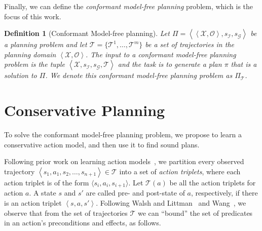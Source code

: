 \documentclass{article}
\newtheorem{definition}{Definition}
\newcommand{\tuple}[1]{\ensuremath{\left \langle #1 \right \rangle }}
\begin{document}
	Finally, we can define the {\em conformant model-free planning} problem, which is the focus of this work. 
	
	\begin{definition}[Conformant Model-free planning]
		Let $\Pi=\tuple{\tuple{\mathcal{X},\mathcal{O}},s_\mathcal{I}, s_\mathcal{G}}$ be a planning 
		problem and let $\mathcal{T}=\{\mathcal{T}^1,\ldots,\mathcal{T}^m\}$ be a set of trajectories in 
		the planning domain $\tuple{\mathcal{X},\mathcal{O}}$. 
		The input to a conformant model-free planning problem is 
		the tuple $\tuple{\mathcal{X},s_\mathcal{I}, s_\mathcal{G}, \mathcal{T}}$
		and the task is to generate a plan $\pi$  that is a solution to $\Pi$. We denote this conformant model-free planning problem as $\Pi_\mathcal{T}$. 
		\label{def:model-free-planning}
	\end{definition}
	
	
	
	\section{Conservative Planning}
	To solve the conformant model-free planning problem, we propose to learn a conservative action model, and then use it to find sound plans.
	
	Following prior work on learning action models~\cite{wang1995learning,wang1994learning,walsh2008efficientLearning}, we partition every observed trajectory $\tuple{s_1,a_1,s_2,\ldots,s_{n+1}}\in\mathcal{T}$ into a set of {\em action triplets}, where each action triplet is of the form $\langle s_i, a_i, s_{i+1}\rangle$. 
	Let $\mathcal{T}(a)$ be all the action triplets for action $a$. 
	A state $s$ and $s'$ are called pre- and post-state of $a$, respectively, if there is an action triplet $\tuple{s,a,s'}$. Following Walsh and Littman~ and Wang~, we observe that from the set of trajectories $\mathcal{T}$ we can ``bound'' the set of predicates in an action's preconditions and effects, as follows. 
	
\end{document}

